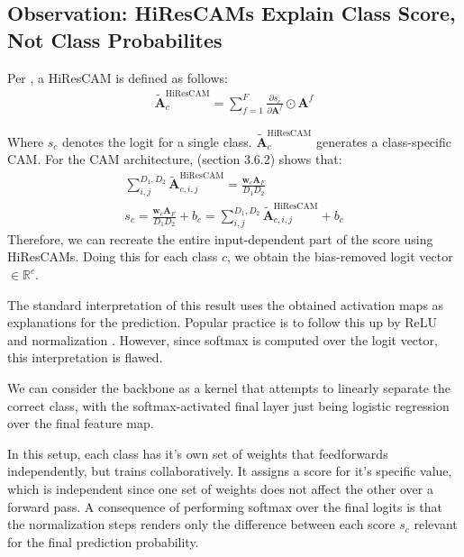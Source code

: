 \documentclass{article}
\theoremstyle{plain}
\theoremstyle{definition}
\theoremstyle{remark}
\begin{document}
\subsection{Observation: HiResCAMs Explain Class Score, Not Class Probabilites}

Per \cite{draelos2020use}, a HiResCAM is defined as follows:
\begin{gather}
	\tilde{\mathcal{\bm{A}}}_c^{\text{HiResCAM}} = \sum^F_{f=1} \frac{\partial s_c}{\partial \bm{A}^f} \odot \bm{A}^f
\end{gather}

Where $s_c$ denotes the logit for a single class. $\tilde{\mathcal{\bm{A}}}_c^{\text{HiResCAM}}$ generates a class-specific CAM. For the CAM architecture, \cite{draelos2020use} (section 3.6.2) shows that:
\begin{gather}
	\sum^{D_1,D_2}_{i,j} \tilde{\mathcal{\bm{A}}}_{c,i,j}^{\text{HiResCAM}} = \frac{\bm{w}_c \bm{A}_F}{D_1 D_2} \\
	s_c = \frac{\bm{w}_c \bm{A}_F}{D_1 D_2} + b_c = \sum^{D_1,D_2}_{i,j} \tilde{\mathcal{\bm{A}}}_{c,i,j}^{\text{HiResCAM}} + b_c
\end{gather}
Therefore, we can recreate the entire input-dependent part of the score using HiResCAMs. Doing this for each class $c$, we obtain the bias-removed logit vector $\in \mathbb{R}^{c}$.

The standard interpretation of this result uses the obtained activation maps as explanations for the prediction. Popular practice is to follow this up by ReLU and normalization \citep{draelos2020use}. However, since softmax is computed over the logit vector, this interpretation is flawed.

We can consider the backbone as a kernel that attempts to linearly separate the correct class, with the softmax-activated final layer just being logistic regression over the final feature map.

In this setup, each class has it's own set of weights that feedforwards independently, but trains collaboratively. It assigns a score for it's specific value, which is independent since one set of weights does not affect the other over a forward pass. A consequence of performing softmax over the final logits is that the normalization steps renders only the difference between each score $s_c$ relevant for the final prediction probability.
\end{document}
